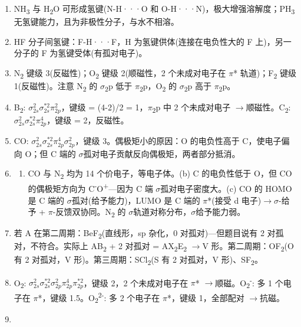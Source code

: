 \documentclass[a4paper,11pt]{ctexart}
\providecommand{\tightlist}{\setlength{\itemsep}{0pt}\setlength{\parskip}{0pt}}
\newcommand{\箭}{\ensuremath{\rightarrow}}
\newcommand{\左箭}{\ensuremath{\leftarrow}}
\newcommand{\上箭}{\ensuremath{\uparrow}}
\newcommand{\下箭}{\ensuremath{\downarrow}}
\newcommand{\衡}{\ensuremath{\rightleftharpoons}}
\newcommand{\双箭}{\ensuremath{\leftrightarrow}}
\newcommand{\约等于}{\ensuremath{\approx}}
\newcommand{\小于等于}{\ensuremath{\leq}}
\newcommand{\大于等于}{\ensuremath{\geq}}
\newcommand{\不等于}{\ensuremath{\neq}}
\newcommand{\西格马}{\ensuremath{\sigma}}
\newcommand{\派}{\ensuremath{\pi}}
\begin{document}
\begin{enumerate}
\item
  NH\textsubscript{3} 与 H\textsubscript{2}O 可形成氢键(N-H···O 和 O-H···N)，极大增强溶解度；PH\textsubscript{3} 无氢键能力，且为非极性分子，与水不相溶。
\item
  HF 分子间氢键：F-H···F，H 为氢键供体(连接在电负性大的 F 上)，另一分子的 F 为氢键受体(有孤对电子)。
\item
  N\textsubscript{2} 键级 3(反磁性)；O\textsubscript{2} 键级 2(顺磁性，2 个未成对电子在 \派* 轨道)；F\textsubscript{2} 键级 1(反磁性)。注意 N\textsubscript{2} 的 \西格马\textsubscript{2}p 低于 \派\textsubscript{2}p，O\textsubscript{2} 的 \西格马\textsubscript{2}p 高于 \派\textsubscript{2}p。
\item
  B\textsubscript{2}: \(\sigma_{2s}^2 \sigma_{2s}^{*2} \pi_{2p}^2\)，键级 = (4-2)/2 = 1，\派\textsubscript{2}p 中 2 个未成对电子 \箭 顺磁性。C\textsubscript{2}: \(\sigma_{2s}^2 \sigma_{2s}^{*2} \pi_{2p}^4\)，键级 = 2，反磁性。
\item
  CO: \(\sigma_{2s}^2 \sigma_{2s}^{*2} \pi_{2p}^4 \sigma_{2p}^2\)，键级 3。偶极矩小的原因：O 的电负性高于 C，使电子偏向 O；但 C 端的 \西格马 孤对电子贡献反向偶极矩，两者部分抵消。
\item
  \begin{enumerate}
  \def\labelenumii{(\alph{enumii})}
  \tightlist
  \item
    CO 与 N\textsubscript{2} 均为 14 个价电子，等电子体。(b) C 的电负性低于 O，但 CO 的偶极矩方向为 C\textsuperscript{-}O\textsuperscript{+}---因为 C 端 \西格马 孤对电子密度大。(c) CO 的 HOMO 是 C 端的 \西格马 孤对(给予能力)，LUMO 是 C 端的 \派*(接受 d 电子)\箭 \西格马-给予 + \派-反馈双协同。N\textsubscript{2} 的 \西格马 轨道对称分布，\西格马 给予能力弱。
  \end{enumerate}
\item
  若 A 在第二周期：BeF\textsubscript{2}(直线形，sp 杂化，0 对孤对)---但题目说有 2 对孤对，不符合。实际上 AB\textsubscript{2} + 2 对孤对 = AX\textsubscript{2}E\textsubscript{2} \箭 V 形。第二周期：OF\textsubscript{2}(O 有 2 对孤对，V 形)。第三周期：SCl\textsubscript{2}(S 有 2 对孤对，V 形)、SF\textsubscript{2}。
\item
  O\textsubscript{2}: \(\sigma_{2s}^2 \sigma_{2s}^{*2} \sigma_{2p}^2 \pi_{2p}^4 \pi_{2p}^{*2}\)，键级 2，2 个未成对电子在 \派* \箭 顺磁。O\textsubscript{2}\textsuperscript{-}: 多 1 个电子在 \派*，键级 1.5。O\textsubscript{2}\textsuperscript{2-}: 多 2 个电子在 \派*，键级 1，全部配对 \箭 抗磁。
\item
  \begin{enumerate}

\end{enumerate}
\end{enumerate}
\end{document}
